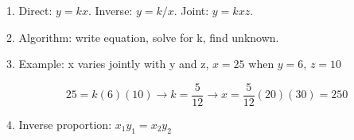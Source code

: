 1. Direct: $y = kx$. Inverse: $y = k/x$. Joint: $y = kxz$.

2. Algorithm: write equation, solve for k, find unknown.

3. Example: x varies jointly with y and z, $x=25$ when $y=6$, $z=10$

$$ 25 = k(6)(10) \rightarrow k = \frac{5}{12} \rightarrow x = \frac{5}{12}(20)(30) = 250 $$

4. Inverse proportion: $x_1 y_1 = x_2 y_2$
